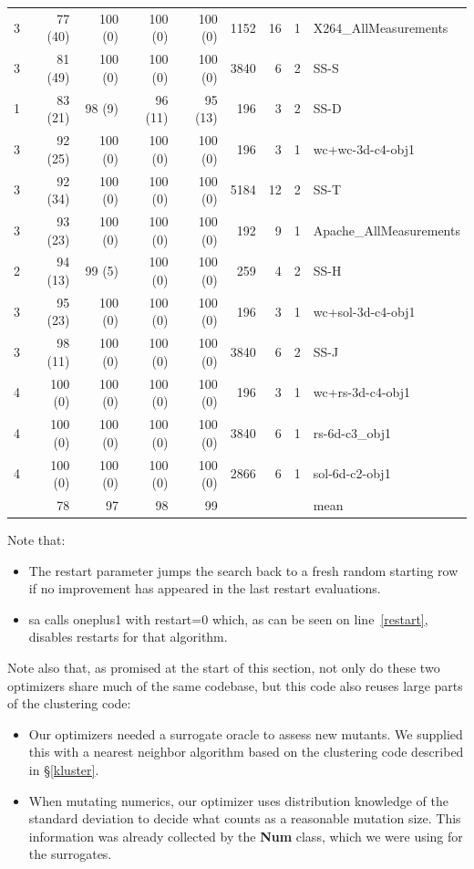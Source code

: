 \documentclass[AMA,STIX2COL]{WileyNJDv5}
\newcommand{\cls}[1]{%
  \setlength{\fboxsep}{1.5pt}%
  \colorbox{clsbg}{\sffamily\bfseries{#1}}%
}
\begin{document}
{\begin{table}[t]
\begin{tabular}{rrrrrrrrl}
3 &  77 (40) & 100 (0)  & 100 (0)  & 100 (0)  &  1152 & 16 & 1 & X264\_AllMeasurements \\
3 &  81 (49) & 100 (0)  & 100 (0)  & 100 (0)  &  3840 &  6 & 2 & SS-S \\
1 &  83 (21) &  98 (9)  &  96 (11) &  95 (13) &   196 &  3 & 2 & SS-D \\
3 &  92 (25) & 100 (0)  & 100 (0)  & 100 (0)  &   196 &  3 & 1 & wc+wc-3d-c4-obj1 \\
3 &  92 (34) & 100 (0)  & 100 (0)  & 100 (0)  &  5184 & 12 & 2 & SS-T \\
3 &  93 (23) & 100 (0)  & 100 (0)  & 100 (0)  &   192 &  9 & 1 & Apache\_AllMeasurements \\
2 &  94 (13) &  99 (5)  & 100 (0)  & 100 (0)  &   259 &  4 & 2 & SS-H \\
3 &  95 (23) & 100 (0)  & 100 (0)  & 100 (0)  &   196 &  3 & 1 & wc+sol-3d-c4-obj1 \\
3 &  98 (11) & 100 (0)  & 100 (0)  & 100 (0)  &  3840 &  6 & 2 & SS-J \\
4 & 100 (0)  & 100 (0)  & 100 (0)  & 100 (0)  &   196 &  3 & 1 & wc+rs-3d-c4-obj1 \\
4 & 100 (0)  & 100 (0)  & 100 (0)  & 100 (0)  &  3840 &  6 & 1 & rs-6d-c3\_obj1 \\
4 & 100 (0)  & 100 (0)  & 100 (0)  & 100 (0)  &  2866 &  6 & 1 & sol-6d-c2-obj1 \\
\midrule
  &  78      &  97      &  98      &  99      &       &    &   & mean 
\end{tabular}
\end{table}
Note that:
\begin{itemize}
\item The \textsf{restart} parameter jumps the search back to a
fresh random starting row if no improvement has appeared in the
last \textsf{restart} evaluations.  
\item \textsf{sa} calls \textsf{oneplus1} with \textsf{restart=0}
which, as can be seen on line~\ref{restart}, disables restarts for
that algorithm.
\end{itemize}
Note also that, as promised at the start of this section, not only
do these two optimizers share much of the same codebase, but this
code also reuses large parts of the clustering code:
\begin{itemize}
\item Our optimizers needed a surrogate oracle to assess new
mutants. We supplied this with a nearest neighbor algorithm based
on the clustering code  described in \S\ref{kluster}.
\item When mutating numerics, our optimizer uses distribution
knowledge of the standard deviation to decide what counts as a
reasonable mutation size. This information was already collected
by the \cls{Num} class, which we were using for the surrogates.
\end{itemize}



}
\end{document}
